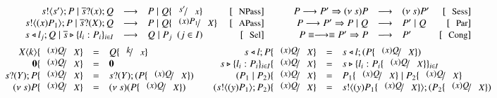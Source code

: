 \begin{figure}[t!]
\[
	\begin{array}{c}
		\begin{array}{rclrcrclr}
			\bout{s}{s'} P \Par \binp{\dual{s}}{x} Q & \red & P \Par Q \subst{s'}{x} & \orule{NPass} & \quad & P \red P' \Rightarrow \news{s} P & \red & \news{s} P'  & \orule{Sess}\\
			\bout{s}{\abs{x}{P_1}} P \Par \binp{\dual{s}}{\X} Q & \red & P \Par Q \subst{\abs{x}{P_1}}{\X}\ & \orule{APass} & & P \red P' \Rightarrow   P \Par Q & \red &  P' \Par Q  & \orule{Par} \\
			\bsel{s}{l_j} Q \Par \bbra{\dual{s}}{l_i : P_i}_{i \in I} & \red & Q \Par P_j ~~(j \in I)~~  & \orule{Sel} & & P \scong \red \scong P' \Rightarrow P & \red & P' & \orule{Cong}
		\end{array}
		\vspace{2mm} \\
		\begin{array}{rclcrcl}
			\appl{X}{k} \subst{\abs{x}{Q}}{\X} & = & Q \subst{k}{x} &  & \bsel{s}{l} P \subst{\abs{x}{Q}}{\X} & = & \bsel{s}{l} (P \subst{\abs{x}{Q}}{\X})\\
			\inact \subst{\abs{x}{Q}}{\X} & = & \inact & & \bbra{s}{l_i : P_i}_{i \in I} \subst{\abs{x}{Q}}{\X} & = & \bbra{s}{l_i : P_i \subst{\abs{x}{Q}}{\X}}_{i \in I} 
			\\
			\binp{s}{\Y} P \subst{\abs{x}{Q}}{\X} & = &  \binp{s}{\Y} (P \subst{\abs{x}{Q}}{\X}) & & (P_1 \Par P_2) \subst{\abs{x}{Q}}{\X} & = & P_1 \subst{\abs{x}{Q}}{\X} \Par P_2 \subst{\abs{x}{Q}}{\X}
			\\
			\news{s} P \subst{\abs{x}{Q}}{\X} & = & \news{s} (P \subst{\abs{x}{Q}}{\X})  & & (\bout{s}{\abs{y}{P_1}} P_2) \subst{\abs{x}{Q}}{\X} & = & \bout{s}{\abs{y}{P_1 \subst{\abs{x}{Q}}{\X}}} (P_2 \subst{\abs{x}{Q}}{\X})

\end{array}
\end{array}\]
\end{figure}
